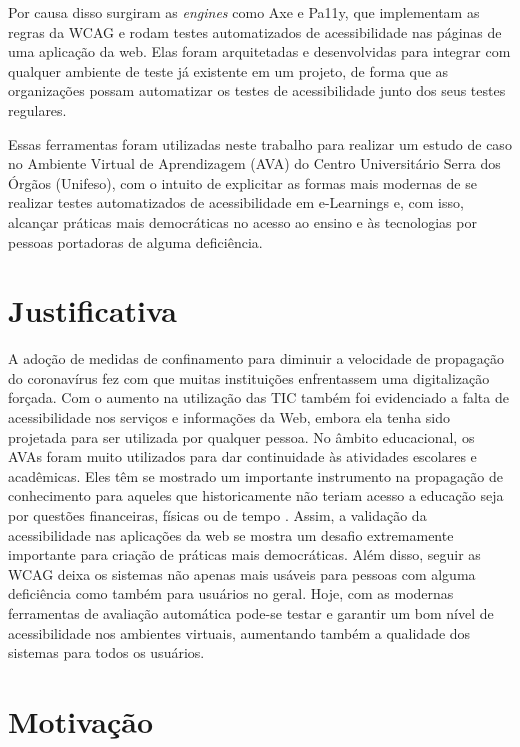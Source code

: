 \documentclass[
	12pt,				%
	openright,			%
	oneside,			%
	a4paper,			%
	chapter=TITLE,		%
	section=TITLE,		%
	subsection=TITLE,	%
	subsubsection=TITLE,%
	english,			%
	brazil				%
	]{abntex2}
\theoremstyle{definition}
\begin{document}
Por causa disso surgiram as \textit{engines} como Axe e Pa11y, que implementam as regras da WCAG e rodam testes automatizados de acessibilidade nas páginas de uma aplicação da web. Elas foram arquitetadas e desenvolvidas para integrar com qualquer ambiente de teste já existente em um projeto, de forma que as organizações possam automatizar os testes de acessibilidade junto dos seus testes regulares.

Essas ferramentas foram utilizadas neste trabalho para realizar um estudo de caso no Ambiente Virtual de Aprendizagem (AVA) do Centro Universitário Serra dos Órgãos (Unifeso), com o intuito de explicitar as formas mais modernas de se realizar testes automatizados de acessibilidade em e-Learnings e, com isso, alcançar práticas mais democráticas no acesso ao ensino e às tecnologias por pessoas portadoras de alguma deficiência.


\section{Justificativa}

A adoção de medidas de confinamento para diminuir a velocidade de propagação do coronavírus fez com que muitas instituições enfrentassem uma digitalização forçada. Com o aumento na utilização das TIC também foi evidenciado a falta de acessibilidade nos serviços e informações da Web, embora ela tenha sido projetada para ser utilizada por qualquer pessoa. No âmbito educacional, os AVAs foram muito utilizados para dar continuidade às atividades escolares e acadêmicas. Eles têm se mostrado um importante instrumento na propagação de conhecimento para aqueles que historicamente não teriam acesso a educação seja por questões financeiras, físicas ou de tempo \cite{sharma2014quantitative}. Assim, a validação da acessibilidade nas aplicações da web se mostra um desafio extremamente importante para criação de práticas mais democráticas. Além disso, seguir as WCAG deixa os sistemas não apenas mais usáveis para pessoas com alguma deficiência como também para usuários no geral. Hoje, com as modernas ferramentas de avaliação automática pode-se testar e garantir um bom nível de acessibilidade nos ambientes virtuais, aumentando também a qualidade dos sistemas para todos os usuários.
    
\section{Motivação}
\end{document}
